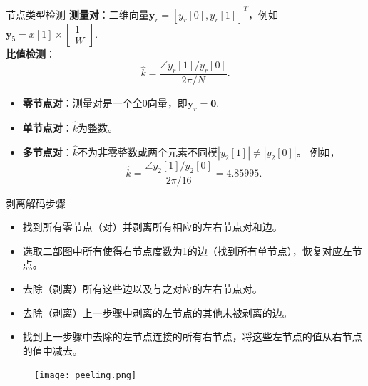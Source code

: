 \documentclass{ldr-simple-gray}
\begin{document}


\begin{frame}{节点类型检测}
    \textbf{测量对}：二维向量$\mathbf{y}_r = [y_r[0], y_r[1]]^T$，例如
    $\mathbf{y}_5 = x[1] \times
    \left[
        \begin{array}{c}
            1 \\ W
        \end{array}
    \right]$.\\
    \textbf{比值检测}：
    \begin{equation*}
        \label{k}
        \hat k = \frac{\angle y_r[1] / y_r[0]}{2 \pi / N}.
    \end{equation*}
    \begin{itemize}
        \item \textbf{零节点对}：测量对是一个全0向量，即$\mathbf{y}_r = \mathbf{0}$.
        \item \textbf{单节点对}：$\hat k$为整数。
        \item \textbf{多节点对}：$\hat k$不为非零整数或两个元素不同模$|y_2[1]| \neq |y_2[0]|$。
        例如，
        \begin{equation*}
            \hat k = \frac{\angle y_2[1] / y_2[0]}{2 \pi / 16} = 4.85995. 
        \end{equation*}
    \end{itemize}
\end{frame}

\begin{frame}{剥离解码步骤}
    \begin{itemize}
        \item 找到所有零节点（对）并剥离所有相应的左右节点对和边。
        \item 选取二部图中所有使得右节点度数为1的边（找到所有单节点），恢复对应左节点。
        \item 去除（剥离）所有这些边以及与之对应的左右节点对。
        \item 去除（剥离）上一步骤中剥离的左节点的其他未被剥离的边。
        \item 找到上一步骤中去除的左节点连接的所有右节点，将这些左节点的值从右节点的值中减去。
    \end{itemize}
    \begin{figure}
        \centering
        \texttt{[image: peeling.png]}
    \end{figure}
\end{frame}
\end{document}
